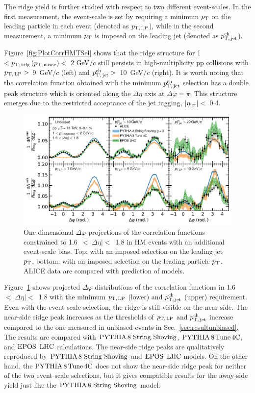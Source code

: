 The ridge yield is further studied with respect to two different event-scales. In the first measurement, the event-scale is set by requiring a minimum $p_\mathrm{T}$ on the leading particle in each event (denoted as $p_\mathrm{T,\,LP}$), while in the second measurement, a minimum $p_\mathrm{T}$ is imposed on the leading jet (denoted as $p_\mathrm{T,\,jet}^\mathrm{ch}$). 

Figure~\ref{fig:PlotCorrHMTSel} shows that the ridge structure for 1~$< p_\mathrm{T,\,trig}\,(p_\mathrm{T,\,assoc}) <$~2 GeV/$c$ still persists in high-multiplicity pp collisions with $p_\mathrm{T,\,LP}>$~9~GeV/$c$ (left) and $p_\mathrm{T,\,jet}^\mathrm{ch}>$~10~GeV/$c$ (right).  %
It is worth noting that the correlation function obtained with the minimum $p_\mathrm{T,\,jet}^\mathrm{ch}$ selection has a double peak structure which is oriented along the $\Delta\eta$ axis at $\Delta\varphi=\pi$. This structure emerges due to the restricted acceptance of the jet tagging, $|\eta_{\rm{jet}}|<$~0.4.

\begin{figure}[h!]
	\centering
	\includegraphics[width=0.99\linewidth]{./figures/Fig5_PlotDeltaPhiESE.pdf}
	\caption{ One-dimensional $\Delta\varphi$ projections of the correlation functions constrained to 1.6~$<|\Delta\eta|<$~1.8 in HM events with an additional event-scale bias. Top: with an imposed selection on the leading jet $p_\mathrm{T}$,  bottom: with an imposed selection on the leading particle $p_\mathrm{T}$. ALICE data are compared with prediction of models.}
	\label{fig:PlotDeltaPhiESE}
\end{figure}

Figure~\ref{fig:PlotDeltaPhiESE} shows projected $\Delta\varphi$ distributions of the correlation functions in 1.6~$<|\Delta\eta|<$~1.8 with the minimum $p_\mathrm{T,\,LP}$ (lower) and $p_\mathrm{T,\,jet}^\mathrm{ch}$ (upper) requirement. Even with the event-scale selection, the ridge is still visible on the near-side. The near-side ridge peak increases as the thresholds of $p_\mathrm{T,\,LP}$ and $p_\mathrm{T,\,jet}^\mathrm{ch}$ increase compared to the one measured in unbiased events in Sec.~\ref{sec:resultunbiased}. The results are compared with ${\mathrm{PYTHIA}\,8~\mathrm{String}~}\mathrm{Shoving}$, $\mathrm{PYTHIA}\,8\,\mathrm{Tune\,4C}$, and ${\mathrm{EPOS}\,~\mathrm{LHC}}$ calculations. The near-side ridge peaks are qualitatively reproduced by ${\mathrm{PYTHIA}\,8~\mathrm{String}~}\mathrm{Shoving}$ and ${\mathrm{EPOS}\,~\mathrm{LHC}}$ models. On the other hand, the $\mathrm{PYTHIA}\,8\,\mathrm{Tune\,4C}$ does not show the  near-side ridge peak for neither of the two event-scale selections, but it gives compatible results for the away-side yield just like the ${\mathrm{PYTHIA}\,8~\mathrm{String}~}\mathrm{Shoving}$ model.

